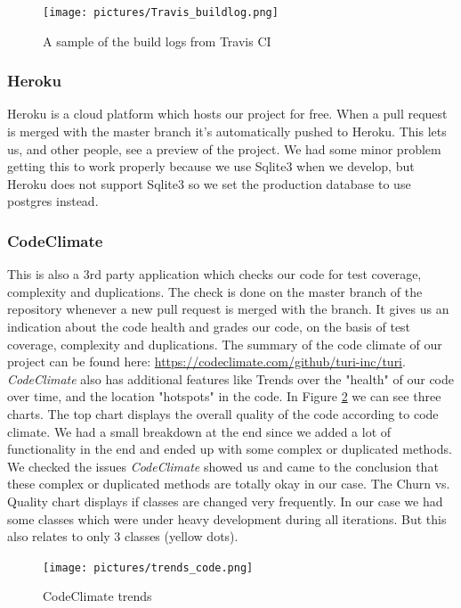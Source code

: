 \documentclass[a4paper]{article}
\begin{document}
\begin{figure}[!h]
  \begin{center}
    \texttt{[image: pictures/Travis\_buildlog.png]}
    \caption{A sample of the build logs from Travis CI}
    \label{fig:travis_log}
  \end{center}
\end{figure}


\subsubsection{Heroku}
Heroku is a cloud platform which hosts our project for free. When a pull request is merged with the master branch it's automatically pushed to Heroku. This lets us, and other people, see a preview of the project. We had some minor problem getting this to work properly because we use Sqlite3 when we develop, but Heroku does not support Sqlite3 so we set the production database to use postgres instead.

\subsubsection{CodeClimate}
This is also a 3rd party application which checks our code for test coverage, complexity and duplications. The check is done on the master branch of the repository whenever a new pull request is merged with the branch. It gives us an indication about the code health and grades our code, on the basis of test coverage, complexity and duplications. The summary of the code climate of our project can be found here: \url{https://codeclimate.com/github/turi-inc/turi}. \\
\textit{CodeClimate} also has additional features like Trends over the "health" of our code over time, and the location "hotspots" in the code. In Figure \ref{fig:codeclimate} we can see three charts. The top chart displays the overall quality of the code according to code climate. We had a small breakdown at the end since we added a lot of functionality in the end and ended up with some complex or duplicated methods. We checked the issues \textit{CodeClimate} showed us and came to the conclusion that these complex or duplicated methods are totally okay in our case. The Churn vs. Quality chart displays if classes are changed very frequently. In our case we had some classes which were under heavy development during all iterations. But this also relates to only 3 classes (yellow dots).

\begin{figure}[!h]
  \begin{center}
    \texttt{[image: pictures/trends\_code.png]}
    \caption{CodeClimate trends}
    \label{fig:codeclimate}
  \end{center}
\end{figure}
\end{document}
